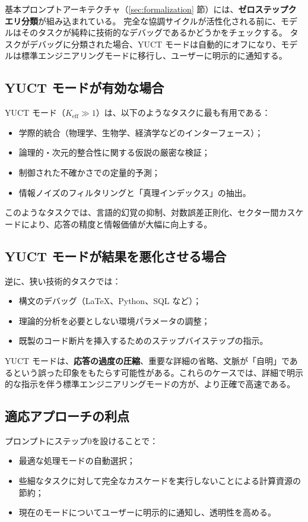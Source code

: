 \documentclass[13pt,a4paper]{ltjsarticle}
\begin{document}
	基本プロンプトアーキテクチャ（\ref{sec:formalization} 節）には、\textbf{ゼロステップクエリ分類}が組み込まれている。
	完全な協調サイクルが活性化される前に、モデルはそのタスクが純粋に技術的なデバッグであるかどうかをチェックする。
	タスクがデバッグに分類された場合、YUCT モードは自動的にオフになり、モデルは標準エンジニアリングモードに移行し、ユーザーに明示的に通知する。
	
	\subsection{YUCT モードが有効な場合}
	YUCT モード（\(K_{\mathrm{eff}} \gg 1\)）は、以下のようなタスクに最も有用である：
	\begin{itemize}
		\item 学際的統合（物理学、生物学、経済学などのインターフェース）；
		\item 論理的・次元的整合性に関する仮説の厳密な検証；
		\item 制御された不確かさでの定量的予測；
		\item 情報ノイズのフィルタリングと「真理インデックス」の抽出。
	\end{itemize}
	このようなタスクでは、言語的幻覚の抑制、対数誤差正則化、セクター間カスケードにより、応答の精度と情報価値が大幅に向上する。
	
	\subsection{YUCT モードが結果を悪化させる場合}
	逆に、狭い技術的タスクでは：
	\begin{itemize}
		\item 構文のデバッグ（LaTeX、Python、SQL など）；
		\item 理論的分析を必要としない環境パラメータの調整；
		\item 既製のコード断片を挿入するためのステップバイステップの指示。
	\end{itemize}
	YUCT モードは、\textbf{応答の過度の圧縮}、重要な詳細の省略、文脈が「自明」であるという誤った印象をもたらす可能性がある。これらのケースでは、詳細で明示的な指示を伴う標準エンジニアリングモードの方が、より正確で高速である。
	
	\subsection{適応アプローチの利点}
	プロンプトにステップ0を設けることで：
	\begin{itemize}
		\item 最適な処理モードの自動選択；
		\item 些細なタスクに対して完全なカスケードを実行しないことによる計算資源の節約；
		\item 現在のモードについてユーザーに明示的に通知し、透明性を高める。
	\end{itemize}
	
\end{document}
